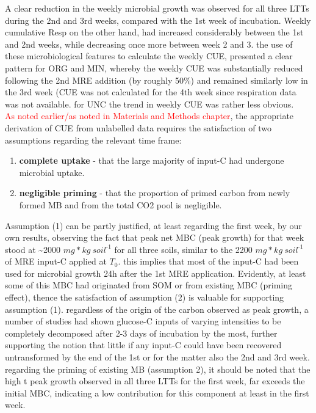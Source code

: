 \documentclass[12pt]{report}
\newcommand{\myRed}[1]{\textcolor{red}{#1}} %
\newlength{\SpaceAfterUnit}
\newcommand{\genericunit}{$ mg * kg\ soil^{\text{-}1}$ \hspace*{\SpaceAfterUnit}}
\begin{document}
A clear reduction in the weekly microbial growth was observed for all three LTTs during the 2nd and 3rd weeks, compared with the 1st week of incubation.
Weekly cumulative Resp on the other hand, had increased considerably between the 1st and 2nd weeks, while decreasing once more between week 2 and 3. 
the use of these microbiological features to calculate the weekly CUE, presented a clear pattern for ORG and MIN, whereby the weekly CUE was substantially reduced following the 2nd MRE addition (by roughly 50\%) and remained similarly low in the 3rd week (CUE was not calculated for the 4th week since respiration data was not available. for UNC the trend in weekly CUE was rather less obvious.\\ 
\myRed{As noted earlier/as noted in Materials and Methods chapter}, the appropriate derivation of CUE from unlabelled data requires the satisfaction of two assumptions regarding the relevant time frame:
\begin{enumerate}
	\item \label{item: complete_uptake}\textbf{complete uptake} - that the large majority of input-C had undergone microbial uptake.
	\item \label{item: negligible_priming}\textbf{negligible priming} - that the proportion of primed carbon from newly formed MB and from the total CO2 pool is negligible.
\end{enumerate}
Assumption (1) can be partly justified, at least regarding the first week, by  our own results,  observing the fact that peak net MBC (peak growth) for that week stood at \~{}2000 \genericunit for all three soils, similar to the 2200 \genericunit of MRE input-C applied at $ T_0 $. this implies that most of the  input-C had been used for microbial growth 24h after the 1st MRE application. Evidently, at least some of this MBC had originated from SOM or from existing MBC (priming effect), thence the satisfaction of assumption (2) is valuable for supporting assumption (1). regardless of the origin of the carbon observed as peak growth, a  number of studies had shown glucose-C inputs of varying intensities to be completely decomposed after 2-3 days of incubation by the most\citep{hill2008, landi2006}, further supporting the notion that little if any input-C could have been recovered untransformed by the end of the 1st or for the matter also the 2nd and 3rd week. 
regarding the priming of existing MB (assumption 2), it should be noted that the high t peak growth observed in all three LTTs for the first week, far exceeds the initial MBC, indicating a low contribution for this component at least in the first week. 
\end{document}
